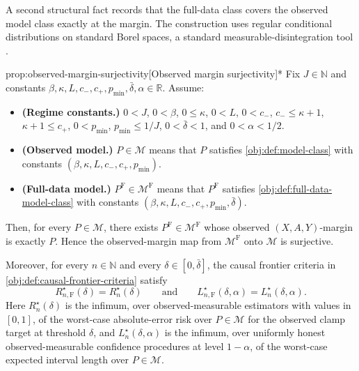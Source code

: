 \documentclass[11pt]{article}
\begin{document}
A second structural fact records that the full-data class covers the observed model class exactly at the margin. The construction uses regular conditional distributions on standard Borel spaces, a standard measurable-disintegration tool \citep[Theorem 6.3]{Kallenberg2002Foundations}.

\begin{propositionv}{prop:observed-margin-surjectivity}[Observed margin surjectivity]*
Fix \(J\in\mathbb N\) and constants \(\beta,\kappa,L,c_-,c_+,p_{\min},\bar\delta,\alpha\in\mathbb R\). Assume:
\begin{itemize}
\item \textbf{(Regime constants.)} \(0<J\), \(0<\beta\), \(0\leq \kappa\), \(0<L\), \(0<c_-\), \(c_-\leq \kappa+1\), \(\kappa+1\leq c_+\), \(0<p_{\min}\), \(p_{\min}\leq 1/J\), \(0<\bar\delta<1\), and \(0<\alpha<1/2\).
\item \textbf{(Observed model.)} \(P\in\mathcal M\) means that \(P\) satisfies \cref{obj:def:model-class} with constants \((\beta,\kappa,L,c_-,c_+,p_{\min})\).
\item \textbf{(Full-data model.)} \(P^{\mathrm F}\in\mathcal M^{\mathrm F}\) means that \(P^{\mathrm F}\) satisfies \cref{obj:def:full-data-model-class} with constants \((\beta,\kappa,L,c_-,c_+,p_{\min},\bar\delta)\).
\end{itemize}
Then, for every \(P\in\mathcal M\), there exists \(P^{\mathrm F}\in\mathcal M^{\mathrm F}\) whose observed \((X,A,Y)\)-margin is exactly \(P\). Hence the observed-margin map from \(\mathcal M^{\mathrm F}\) onto \(\mathcal M\) is surjective.

Moreover, for every \(n\in\mathbb N\) and every \(\delta\in[0,\bar\delta]\), the causal frontier criteria in \cref{obj:def:causal-frontier-criteria} satisfy
\[
R_{n,\mathrm F}^{\star}(\delta)=R_n^\star(\delta)
\qquad\text{and}\qquad
L_{n,\mathrm F}^{\star}(\delta,\alpha)=L_n^\star(\delta,\alpha).
\]
Here \(R_n^\star(\delta)\) is the infimum, over observed-measurable estimators with values in \([0,1]\), of the worst-case absolute-error risk over \(P\in\mathcal M\) for the observed clamp target at threshold \(\delta\), and \(L_n^\star(\delta,\alpha)\) is the infimum, over uniformly honest observed-measurable confidence procedures at level \(1-\alpha\), of the worst-case expected interval length over \(P\in\mathcal M\).
\end{propositionv}
\end{document}
